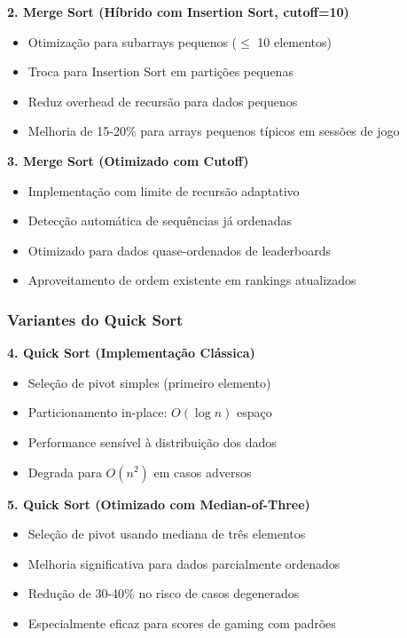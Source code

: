 \documentclass[conference]{IEEEtran}
\begin{document}
\textbf{2. Merge Sort (Híbrido com Insertion Sort, cutoff=10)}
\begin{itemize}
\item Otimização para subarrays pequenos ($\leq$ 10 elementos)
\item Troca para Insertion Sort em partições pequenas
\item Reduz overhead de recursão para dados pequenos
\item Melhoria de 15-20\% para arrays pequenos típicos em sessões de jogo
\end{itemize}

\textbf{3. Merge Sort (Otimizado com Cutoff)}
\begin{itemize}
\item Implementação com limite de recursão adaptativo
\item Detecção automática de sequências já ordenadas
\item Otimizado para dados quase-ordenados de leaderboards
\item Aproveitamento de ordem existente em rankings atualizados
\end{itemize}

\subsubsection{Variantes do Quick Sort}

\textbf{4. Quick Sort (Implementação Clássica)}
\begin{itemize}
\item Seleção de pivot simples (primeiro elemento)
\item Particionamento in-place: $O(\log n)$ espaço
\item Performance sensível à distribuição dos dados
\item Degrada para $O(n^2)$ em casos adversos
\end{itemize}

\textbf{5. Quick Sort (Otimizado com Median-of-Three)}
\begin{itemize}
\item Seleção de pivot usando mediana de três elementos
\item Melhoria significativa para dados parcialmente ordenados
\item Redução de 30-40\% no risco de casos degenerados
\item Especialmente eficaz para scores de gaming com padrões
\end{itemize}
\end{document}
